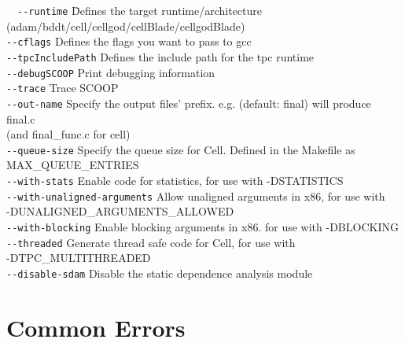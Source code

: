 \documentclass[letterpaper]{article}
\begin{document}
  \begin{tabbing}
  \ \ \=\verb!--runtime!\hspace{9em} \=
  Defines the target runtime/architecture\\
                                    \>\>(adam/bddt/cell/cellgod/cellBlade/cellgodBlade)\\[1ex]
  \>\verb!--cflags!                   \>Defines the flags you want to pass to gcc\\[1ex]
  \>\verb!--tpcIncludePath!           \>Defines the include path for the tpc runtime\\[1ex]
  \>\verb!--debugSCOOP!               \>Print debugging information\\[1ex]
  \>\verb!--trace!                    \>Trace SCOOP\\[1ex]
  \>\verb!--out-name!                 \>Specify the output files' prefix. e.g. (default: final) will produce final.c\\
                                    \>\>(and final\_func.c for cell)\\[1ex]
  \>\verb!--queue-size!               \>Specify the queue size for Cell. Defined in the Makefile as\\
                                    \>\>MAX\_QUEUE\_ENTRIES\\[1ex]
  \>\verb!--with-stats!               \>Enable code for statistics, for use with -DSTATISTICS\\[1ex]
  \>\verb!--with-unaligned-arguments! \>Allow unaligned arguments in x86, for use with\\
                                    \>\>-DUNALIGNED\_ARGUMENTS\_ALLOWED\\[1ex]
  \>\verb!--with-blocking!            \>Enable blocking arguments in x86. for use with -DBLOCKING\\[1ex]
  \>\verb!--threaded!                 \>Generate thread safe code for Cell, for use with\\
                                    \>\>-DTPC\_MULTITHREADED\\[1ex]
  \>\verb!--disable-sdam!             \>Disable the static dependence analysis module
  \end{tabbing}

\section{Common Errors}
\end{document}
